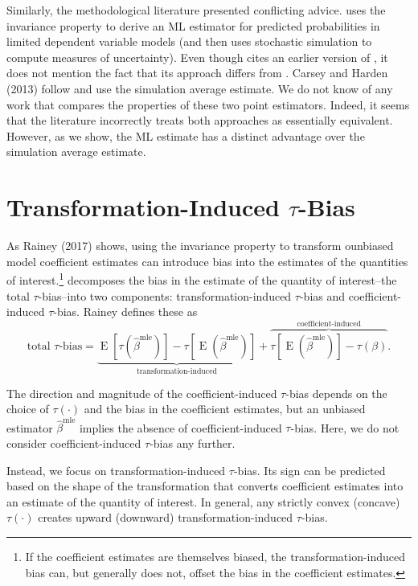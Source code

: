 \documentclass[11pt]{article}
\DeclareMathOperator*{\E}{\text{E}}
\begin{document}
Similarly, the methodological literature presented conflicting advice.
\cite{Herron1999} uses the invariance property to derive an ML estimator for predicted probabilities in limited dependent variable models (and then uses stochastic simulation to compute measures of uncertainty).
Even though \cite{Herron1999} cites an earlier version of \cite{KingTomzWittenberg2000}, it does not mention the fact that its approach differs from \cite{KingTomzWittenberg2000}.
Carsey and Harden (2013) follow \cite{KingTomzWittenberg2000} and use the simulation average estimate.
We do not know of any work that compares the properties of these two point estimators.
Indeed, it seems that the literature incorrectly treats both approaches as essentially equivalent.
However, as we show, the ML estimate has a distinct advantage over the simulation average estimate.

\section*{Transformation-Induced $\tau$-Bias}

As Rainey (2017) shows, using the invariance property to transform ounbiased model coefficient estimates can introduce bias into the estimates of the quantities of interest.\footnote{If the coefficient estimates are themselves biased, the transformation-induced bias can, but generally does not, offset the bias in the coefficient estimates.} \citet[p. 404]{Rainey2017} decomposes the bias in the estimate of the quantity of interest--the {total $\tau$-bias}--into two components: {transformation-induced $\tau$-bias} and {coefficient-induced $\tau$-bias.} Rainey defines these as
\begin{equation}
\text{total } \tau\text{-bias}= \underbrace{ \E[\tau(\hat{\beta}^\text{mle})]-  \tau[\E(\hat{\beta}^\text{mle})]  }_{\text{transformation-induced}} + \overbrace{  \tau[\E(\hat{\beta}^\text{mle})] - \tau(\beta)  }^{\text{coefficient-induced}}\text{.} \label{eqn:ti-bias}
\end{equation}

The direction and magnitude of the coefficient-induced $\tau$-bias depends on the choice of $\tau(\cdot)$ and the bias in the coefficient estimates, but an unbiased estimator $\hat{\beta}^\text{mle}$ implies the absence of coefficient-induced $\tau$-bias. Here, we do not consider coefficient-induced $\tau$-bias any further.

Instead, we focus on transformation-induced $\tau$-bias. Its sign can be predicted based on the shape of the transformation that converts coefficient estimates into an estimate of the quantity of interest. In general, any strictly convex (concave) $\tau(\cdot)$ creates upward (downward) transformation-induced $\tau$-bias.
\end{document}
